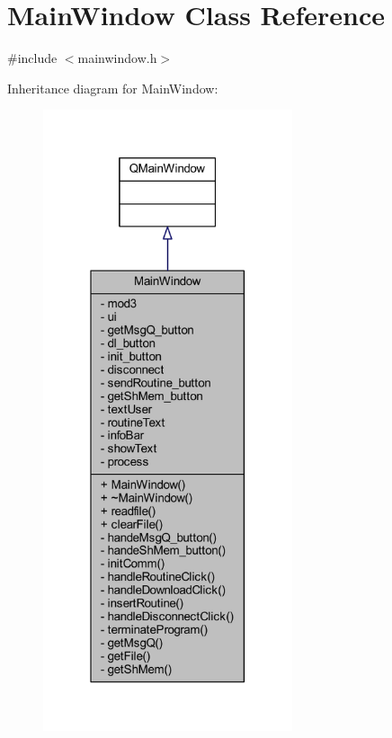 \hypertarget{class_main_window}{}\section{Main\+Window Class Reference}
\label{class_main_window}


{\ttfamily \#include $<$mainwindow.\+h$>$}



Inheritance diagram for Main\+Window\+:
\nopagebreak
\begin{figure}[H]
\begin{center}
\leavevmode
\includegraphics[width=208pt]{class_main_window__inherit__graph}
\end{center}
\end{figure}


